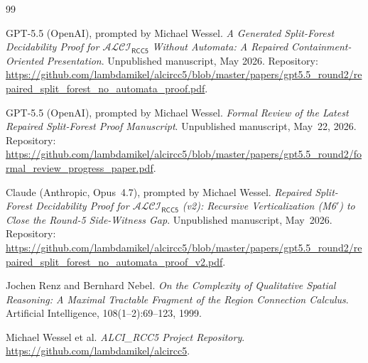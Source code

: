 \documentclass[11pt]{article}
\theoremstyle{definition}
\theoremstyle{remark}
\newcommand{\ALCIRCC}[1]{\mathcal{ALCI}_{\mathsf{RCC#1}}}
\begin{document}
\begin{thebibliography}{99}

GPT-5.5 (OpenAI), prompted by Michael Wessel.
\emph{A Generated Split-Forest Decidability Proof for $\ALCIRCC{5}$
Without Automata: A Repaired Containment-Oriented Presentation}.
Unpublished manuscript, May 2026.  Repository:
\url{https://github.com/lambdamikel/alcircc5/blob/master/papers/gpt5.5_round2/repaired_split_forest_no_automata_proof.pdf}.

GPT-5.5 (OpenAI), prompted by Michael Wessel.
\emph{Formal Review of the Latest Repaired Split-Forest Proof
Manuscript}.  Unpublished manuscript, May~22, 2026.  Repository:
\url{https://github.com/lambdamikel/alcircc5/blob/master/papers/gpt5.5_round2/formal_review_progress_paper.pdf}.

Claude (Anthropic, Opus~4.7), prompted by Michael Wessel.
\emph{Repaired Split-Forest Decidability Proof for $\ALCIRCC{5}$ (v2):
Recursive Verticalization (M6$'$) to Close the Round-5
Side-Witness Gap}.  Unpublished manuscript, May~2026.  Repository:
\url{https://github.com/lambdamikel/alcircc5/blob/master/papers/gpt5.5_round2/repaired_split_forest_no_automata_proof_v2.pdf}.

Jochen Renz and Bernhard Nebel.
\emph{On the Complexity of Qualitative Spatial Reasoning: A
Maximal Tractable Fragment of the Region Connection Calculus}.
Artificial Intelligence, 108(1--2):69--123, 1999.

Michael Wessel et al.
\emph{ALCI\_RCC5 Project Repository}.
\url{https://github.com/lambdamikel/alcircc5}.

\end{thebibliography}
\end{document}
